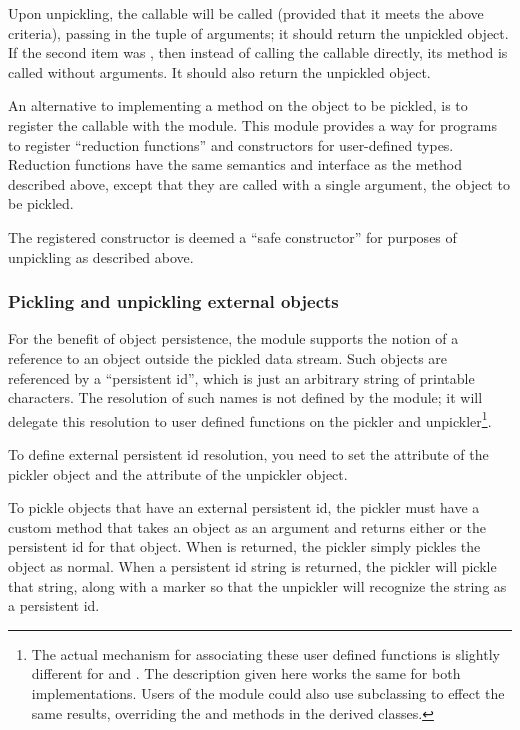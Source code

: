 Upon unpickling, the callable will be called (provided that it meets
the above criteria), passing in the tuple of arguments; it should
return the unpickled object.  If the second item was , then
instead of calling the callable directly, its 
method is called without arguments.  It should also return the
unpickled object.

An alternative to implementing a  method on the
object to be pickled, is to register the callable with the
 module.  This module provides a way
for programs to register ``reduction functions'' and constructors for
user-defined types.   Reduction functions have the same semantics and
interface as the  method described above, except
that they are called with a single argument, the object to be pickled.

The registered constructor is deemed a ``safe constructor'' for purposes
of unpickling as described above.

\subsubsection{Pickling and unpickling external objects}

For the benefit of object persistence, the  module
supports the notion of a reference to an object outside the pickled
data stream.  Such objects are referenced by a ``persistent id'',
which is just an arbitrary string of printable \ASCII{} characters.
The resolution of such names is not defined by the 
module; it will delegate this resolution to user defined functions on
the pickler and unpickler\footnote{The actual mechanism for
associating these user defined functions is slightly different for
 and .  The description given here
works the same for both implementations.  Users of the 
module could also use subclassing to effect the same results,
overriding the  and 
methods in the derived classes.}.

To define external persistent id resolution, you need to set the
 attribute of the pickler object and the
 attribute of the unpickler object.

To pickle objects that have an external persistent id, the pickler
must have a custom  method that takes an
object as an argument and returns either  or the persistent
id for that object.  When  is returned, the pickler simply
pickles the object as normal.  When a persistent id string is
returned, the pickler will pickle that string, along with a marker
so that the unpickler will recognize the string as a persistent id.


